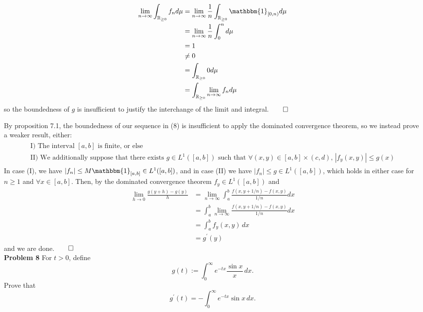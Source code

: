 \documentclass[11pt, letterpaper]{article}
\newcommand{\mbb}[1]{\mathbb{#1}}
\newcommand{\bbm}[1]{\mathbbm{#1}}
\begin{document}
\begin{center}
\begin{minipage}[c]{0.85\linewidth}
\begin{align*}
                \lim_{n\rightarrow\infty}\int_{\mbb{R}_{\geq 0}}f_nd\mu&=\lim_{n\rightarrow\infty}\frac{1}{n}\int_{\mbb{R}_{\geq 0}}\bbm{1}_{[0,n)}d\mu\\
                &=\lim_{n\rightarrow\infty}\frac{1}{n}\int_0^nd\mu\\
                &=1\\
                &\neq 0\\
                &=\int_{\mbb{R}_{\geq 0}}0d\mu\\
                &=\int_{\mbb{R}_{\geq 0}}\lim_{n\rightarrow\infty}f_nd\mu
            \end{align*}
            so the boundedness of $g$ is insufficient to justify the interchange of the limit and integral.\hfill{$\qed$}
        \end{minipage}
    \end{center}\vspace{10pt}
    By proposition 7.1, the boundedness of our sequence in (8) is insufficient to apply the dominated convergence theorem, so we instead prove a weaker result, either:
    \begin{align*}
        \begin{array}{l}
            \text{I) The interval $[a,b]$ is finite, or else}\\
            \text{II) We additionally suppose that there exists $g\in L^1([a,b])$ such that $\forall (x,y)\in[a,b]\times(c,d)$, $|f_y(x,y)|\leq g(x)$}
        \end{array}
    \end{align*} 
    In case (I), we have $|f_n|\leq M\bbm{1}_{[a,b]}\in L^1([a,b])$, and in case (II) we have $|f_n|\leq g\in L^1([a,b])$, which holds in either case for $n\geq 1$ and $\forall x\in[a,b]$.
    Then, by the dominated convergence theorem $f_y\in L^1([a,b])$ and
    \begin{align*}
        \lim_{h\rightarrow 0}\frac{g(y+h)-g(y)}{h}&=\lim_{n\rightarrow\infty}\int_a^b\frac{f(x,y+1/n)-f(x,y)}{1/n}dx\\
        &=\int_a^b\lim_{n\rightarrow\infty}\frac{f(x,y+1/n)-f(x,y)}{1/n}dx\\
        &=\int_a^bf_y(x,y)\,dx\\
        &=g^\prime(y)
    \end{align*}
    and we are done.\hfill{$\qed$}\\[10pt]
    {\bf Problem 8} For $t>0$, define
    \[g(t):=\int_0^\infty e^{-tx}\frac{\sin x}{x}\,dx.\]
    Prove that
    \[g^\prime(t)=-\int_0^\infty e^{-tx}\sin x\,dx.\]
\end{document}
